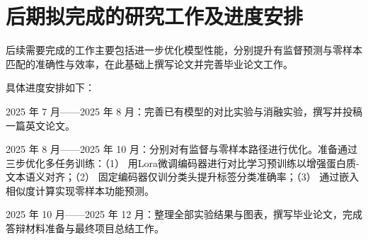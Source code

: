 

\chapter{后期拟完成的研究工作及进度安排}
后续需要完成的工作主要包括进一步优化模型性能，分别提升有监督预测与零样本匹配的准确性与效率，在此基础上撰写论文并完善毕业论文工作。

具体进度安排如下：

2025 年 7 月——2025 年 8 月：完善已有模型的对比实验与消融实验，撰写并投稿一篇英文论文。

2025 年 8 月——2025 年 10 月：分别对有监督与零样本路径进行优化。准备通过三步优化多任务训练：（1） 用Lora微调编码器进行对比学习预训练以增强蛋白质-文本语义对齐；（2） 固定编码器仅训分类头提升标签分类准确率；（3） 通过嵌入相似度计算实现零样本功能预测。

2025 年 10 月——2025 年 12 月：整理全部实验结果与图表，撰写毕业论文，完成答辩材料准备与最终项目总结工作。




